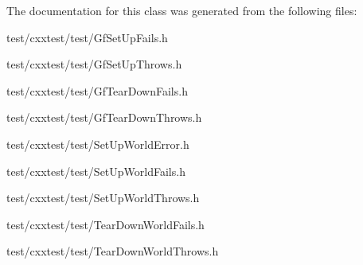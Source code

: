 The documentation for this class was generated from the following files\-:\begin{DoxyCompactItemize}
\item 
test/cxxtest/test/Gf\-Set\-Up\-Fails.\-h\item 
test/cxxtest/test/Gf\-Set\-Up\-Throws.\-h\item 
test/cxxtest/test/Gf\-Tear\-Down\-Fails.\-h\item 
test/cxxtest/test/Gf\-Tear\-Down\-Throws.\-h\item 
test/cxxtest/test/Set\-Up\-World\-Error.\-h\item 
test/cxxtest/test/Set\-Up\-World\-Fails.\-h\item 
test/cxxtest/test/Set\-Up\-World\-Throws.\-h\item 
test/cxxtest/test/Tear\-Down\-World\-Fails.\-h\item 
test/cxxtest/test/Tear\-Down\-World\-Throws.\-h\end{DoxyCompactItemize}
